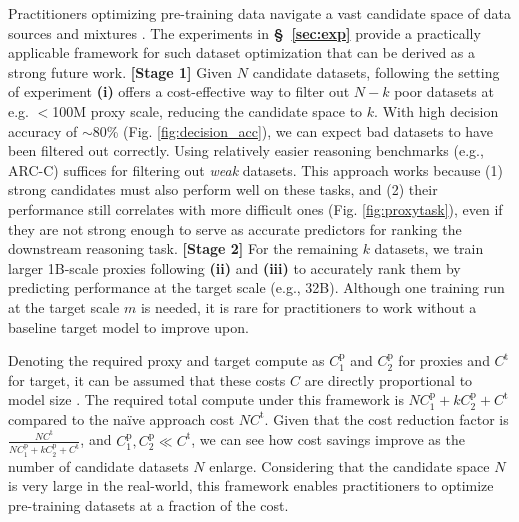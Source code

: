 Practitioners optimizing pre-training data navigate a vast candidate space of data sources and mixtures \citep{xie2023doremi, han2025trillion, liu2025regmix}. The experiments in \textbf{\S\ \ref{sec:exp}} provide a practically applicable framework for such dataset optimization that can be derived as a strong future work. \textbf{[Stage 1]} Given $N$ candidate datasets, following the setting of experiment \textbf{(i)} offers a cost-effective way to filter out $N - k$ poor datasets at e.g. $<$100M proxy scale, reducing the candidate space to $k$. With high decision accuracy of $\sim$80\% (Fig. \ref{fig:decision_acc}), we can expect bad datasets to have been filtered out correctly. Using relatively easier reasoning benchmarks (e.g., ARC-C) suffices for filtering out \textit{weak} datasets. This approach works because (1) strong candidates must also perform well on these tasks, and (2) their performance still correlates with more difficult ones (Fig. \ref{fig:proxytask}), even if they are not strong enough to serve as accurate predictors for ranking the downstream reasoning task. \textbf{[Stage 2]} For the remaining $k$ datasets, we train larger 1B-scale proxies following \textbf{(ii)} and \textbf{(iii)} to accurately rank them by predicting performance at the target scale (e.g., 32B). Although one training run at the target scale $m$ is needed, it is rare for practitioners to work without a baseline target model to improve upon. 

Denoting the required proxy and target compute as $C^\text{p}_1$ and $C^\text{p}_2$ for proxies and $C^\text{t}$ for target, it can be assumed that these costs $C$ are directly proportional to model size \citep{kaplan2020scaling}. The required total compute under this framework is $NC^\text{p}_1 + kC^\text{p}_2 + C^\text{t}$ compared to the naïve approach cost $NC^\text{t}$. Given that the cost reduction factor is $\frac{NC^\text{t}}{NC^\text{p}_1 + kC^\text{p}_2 + C^\text{t}}$, and $C^\text{p}_1, C^\text{p}_2 \ll C^\text{t}$, we can see how cost savings improve as the number of candidate datasets $N$ enlarge. Considering that the candidate space $N$ is very large in the real-world, this framework enables practitioners to optimize pre-training datasets at a fraction of the cost.

